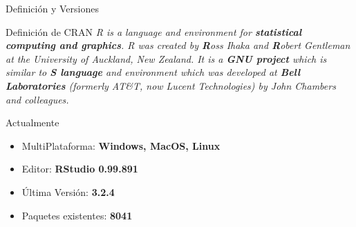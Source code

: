 \documentclass{IFFranciscoME}\usepackage[]{graphicx}\usepackage[]{color}
\begin{document}
\begin{frame}{Definici\'on y Versiones}

\begin{block}{Definici\'on de CRAN}
\textit{R is a language and environment for \textbf{statistical computing and graphics}. 
R was created by \textbf{R}oss Ihaka and \textbf{R}obert Gentleman at the University of
Auckland, New Zealand. It is a \textbf{GNU project} which is similar to \textbf{S language}
and environment which was developed at \textbf{Bell Laboratories} (formerly AT\&T, 
now Lucent Technologies) by John Chambers and colleagues.}
\end{block}

\begin{block}{Actualmente}

\begin{itemize}
  \item MultiPlataforma: \textbf{Windows, MacOS, Linux}
  \item Editor: \textbf{RStudio 0.99.891}
  \item \'Ultima Versi\'on: \textbf{3.2.4}
  \item Paquetes existentes: \textbf{8041}
\end{itemize}

\end{block}

\end{frame}

\end{document}

